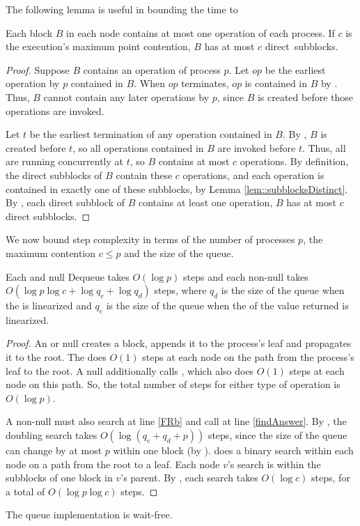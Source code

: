 The following lemma is useful in bounding the time to 
\begin{lemma}\label{blockSize}
Each block $B$ in each node contains at most one operation of each process.
If $c$ is the execution's maximum point contention, $B$ has at most $c$ direct~subblocks.
\end{lemma}
\begin{proof}
Suppose $B$ contains an operation of process $p$.
Let $op$ be the earliest operation by $p$ contained in $B$.
When $op$ terminates, $op$ is contained in $B$ by .
Thus, $B$ cannot contain any later operations by $p$, since $B$ is created before
those operations are invoked.

Let $t$ be the earliest termination of any operation contained in $B$.
By , $B$ is created before $t$, so all operations contained in $B$
are invoked before $t$.  Thus, all are  running concurrently at $t$, so $B$ contains at most $c$ operations.
By definition, the direct subblocks of $B$ contain these $c$ operations, and each operation is contained
in exactly one of these subblocks, by Lemma \ref{lem::subblocksDistinct}.
By , each direct subblock of $B$ contains at least one operation,
$B$ has at most $c$ direct subblocks.
\end{proof}

We now bound step complexity in terms of the number of processes $p$, the maximum contention $c\leq p$ and the size of the queue. 

\begin{mytheorem}\label{enqDeqTime}
Each  and null Dequeue takes $O(\log p)$ steps 
and each non-null  takes
$O(\log p\log c + \log q_e+ \log q_d)$ steps,
where $q_d$ is the size of the queue when the  is linearized and 
$q_e$ is the size of the queue when the  of the value returned is linearized.
\end{mytheorem}
\begin{proof}
An  or null  creates a block, appends it to the process's 
leaf and propagates it to the root.  The   does $O(1)$ steps 
at each node on the path from the process's leaf to the root.
A null  additionally calls , which also does $O(1)$ steps
at each node on this path. 
So, the total number of steps for either type of operation is $O(\log p)$.

A non-null  must also search at line \ref{FRb} and call 
at line \ref{findAnswer}.
By , the doubling search takes $O(\log(q_e+q_d+p))$ steps,
since the size of the queue can change by at most $p$ within one block (by ).
 does a binary search within each node on a path from the root to a leaf.
Each node $v$'s search is within the subblocks of one block in $v$'s parent.
By , each search takes $O(\log c)$ steps, for a total of $O(\log p\log c)$ steps.
\end{proof}

\begin{corollary}
The queue implementation is wait-free.
\end{corollary}
